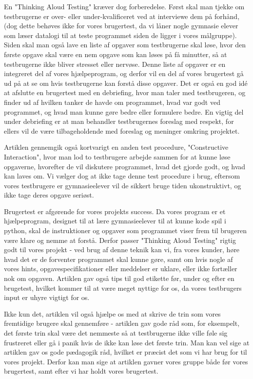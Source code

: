 \documentclass[10pt,a4paper,danish]{article}
\begin{document}
En "Thinking Aloud Testing" kræver dog forberedelse. Først skal man tjekke om testbrugerne er over- eller under-kvalificeret ved at interviewe dem på forhånd, (dog dette behøves ikke for vores brugertest, da vi låner nogle gymnasie elever som læser datalogi til at teste programmet siden de ligger i vores målgruppe). Siden skal man også lave en liste af opgaver som testbrugerne skal løse, hvor den første opgave skal være en nem opgave som kan løses på få minutter, så at testbrugerne ikke bliver stresset eller nervøse. Denne liste af opgaver er en integreret del af vores hjælpeprogram, og derfor vil en del af vores brugertest gå ud på at se om hvis testbrugerne kan forstå disse opgaver. Det er også en god idé at afslutte en brugertest med en debriefing, hvor man taler med testbrugeren, og finder ud af hvilken tanker de havde om programmet, hvad var godt ved programmet, og hvad man kunne gøre bedre eller formulere bedre. En vigtig del under debriefing er at man behandler testbrugernes foreslag med respekt, for ellers vil de være tilbageholdende med foreslag og meninger omkring projektet.

Artiklen gennemgik også kortvarigt en anden test procedure, "Constructive Interaction", hvor man lod to testbrugere arbejde sammen for at kunne løse opgaverne, hvorefter de vil diskutere programmet, hvad det gjorde godt, og hvad kan laves om. Vi vælger dog at ikke tage denne test procedure i brug, eftersom vores testbrugere er gymnasieelever vil de sikkert bruge tiden ukonstruktivt, og ikke tage deres opgave seriøst.

Brugertest er afgørende for vores projekts success. Da vores program er et hjælpeprogram, designet til at lære gymnasieelever til at kunne kode spil i python, skal de instruktioner og opgaver som programmet viser frem til brugeren være klare og nemme at forstå. Derfor passer "Thinking Aloud Testing" rigtig godt til vores projekt - ved brug af denne teknik kan vi, fra vores kunder, høre hvad det er de forventer programmet skal kunne gøre, samt om hvis nogle af vores hints, opgavespecifikationer eller meddelser er uklare, eller ikke fortæller nok om opgaven. Artiklen gav også tips til god etikette før, under og efter en brugetest, hvilket kommer til at være meget nyttige for os, da vores testbrugers input er uhyre vigtigt for os.

Ikke kun det, artiklen vil også hjælpe os med at skrive de trin som vores fremtidige brugere skal gennemføre - artiklen gav gode råd som, for eksempelt, det første trin skal være det nemmeste så at testbrugerne ikke ville føle sig frustreret eller gå i panik hvis de ikke kan løse det første trin. Man kan vel sige at artiklen gav os gode pædagogik råd, hvilket er præcist det som vi har brug for til vores projekt. Derfor kan man sige at artiklen gavner vores gruppe både før vores brugertest, samt efter vi har holdt vores brugertest.
\end{document}
